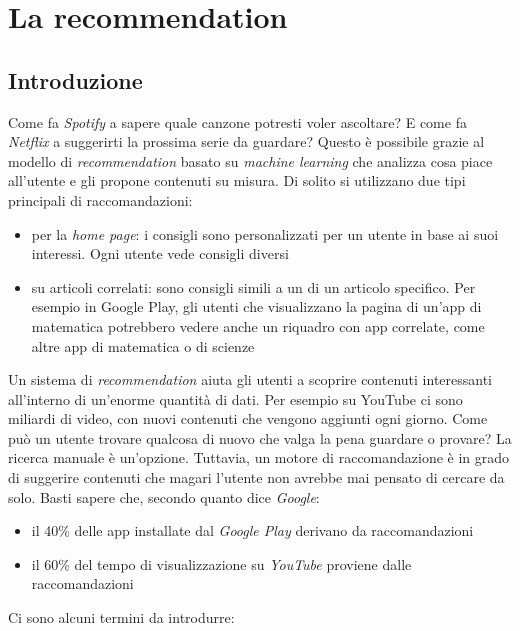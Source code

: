 \chapter{La recommendation}

\section{Introduzione}

Come fa \textit{Spotify} a sapere quale canzone potresti voler ascoltare? E come fa \textit{Netflix} a suggerirti la prossima serie da guardare? Questo è possibile grazie al modello di \textit{recommendation} basato su \textit{machine learning} che analizza cosa piace all'utente e gli propone contenuti su misura. Di solito si utilizzano due tipi principali di raccomandazioni:

\begin{itemize}
    \item per la \textit{home page}: i consigli sono personalizzati per un utente in base ai suoi interessi. Ogni utente vede consigli diversi
    \item su articoli correlati: sono consigli simili a un di un articolo specifico. Per esempio in Google Play, gli utenti che visualizzano la pagina di un'app di matematica potrebbero vedere anche un riquadro con app correlate, come altre app di matematica o di scienze
\end{itemize}

Un sistema di \textit{recommendation} aiuta gli utenti a scoprire contenuti interessanti all'interno di un'enorme quantità di dati. Per esempio su YouTube ci sono miliardi di video, con nuovi contenuti che vengono aggiunti ogni giorno. Come può un utente trovare qualcosa di nuovo che valga la pena guardare o provare? La ricerca manuale è un'opzione. Tuttavia, un motore di raccomandazione è in grado di suggerire contenuti che magari l'utente non avrebbe mai pensato di cercare da solo. Basti sapere che, secondo quanto dice \textit{Google}:

\begin{itemize}
    \item il 40\% delle app installate dal \textit{Google Play} derivano da raccomandazioni
    \item il 60\% del tempo di visualizzazione su \textit{YouTube} proviene dalle raccomandazioni
\end{itemize}


Ci sono alcuni termini da introdurre:

